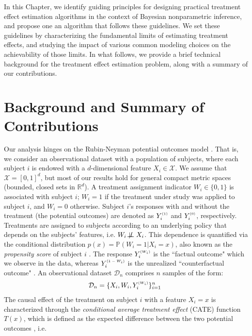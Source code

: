 \documentclass [PhD] {uclathes}
\begin{document}
In this Chapter, we identify guiding principles for designing practical treatment effect estimation algorithms in the context of Bayesian nonparametric inference, and propose one an algorithm that follows these guidelines. We set these guidelines by characterizing the fundamental limits of estimating treatment effects, and studying the impact of various common modeling choices on the achievability of those limits. In what follows, we provide a brief technical background for the treatment effect estimation problem, along with a summary of our contributions. 

\section{Background and Summary of Contributions}
\label{ch2sec1}
Our analysis hinges on the Rubin-Neyman potential outcomes model \cite{rubin2005causal}. That is, we consider an observational dataset with a population of subjects, where each subject $i$ is endowed with a $d$-dimensional feature $X_i \in \mathcal{X}$. We assume that $\mathcal{X} = [0,1]^d$, but most of our results hold for general compact metric spaces (bounded, closed sets in $\mathbb{R}^d$). A treatment assignment indicator $W_i \in \{0,1\}$ is associated with subject $i$; $W_i = 1$ if the treatment under study was applied to subject $i$, and $W_i = 0$ otherwise. Subject $i$'s responses with and without the treatment (the potential outcomes) are denoted as $Y^{\mbox{\tiny $(1)$}}_i$ and $Y^{\mbox{\tiny $(0)$}}_i$, respectively. Treatments are assigned to subjects according to an underlying policy that depends on the subjects' features, i.e. $W_i \not\!\perp\!\!\!\perp X_i$. This dependence is quantified via the conditional distribution $p(x) = \mathbb{P}(W_i=1|X_i=x)$, also known as the \textit{propensity score} of subject $i$ \cite{rosenbaum1984reducing}. The response $Y^{\mbox{\tiny $(W_i)$}}_i$ is the ``factual outcome" which we observe in the data, whereas $Y^{\mbox{\tiny $(1-W_i)$}}_i$ is the unrealized ``counterfactual outcome" \cite{bottou2013counterfactual}. An observational dataset $\mathcal{D}_n$ comprises $n$ samples of the form: 
\begin{align}
\mathcal{D}_n = \{X_i, W_i, Y^{\mbox{\tiny $(W_i)$}}_i\}_{i=1}^n\,\, 
\label{ch2eq1}
\end{align}
The causal effect of the treatment on subject $i$ with a feature $X_i = x$ is characterized through the \textit{conditional average treatment effect} (CATE) function $T(x)$, which is defined as the expected difference between the two potential outcomes \cite{rubin2005causal}, i.e. 
\end{document}
